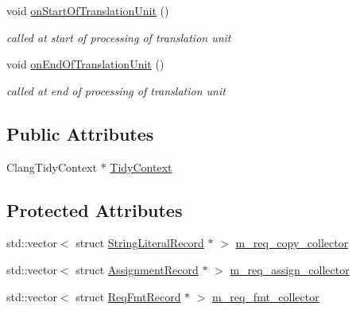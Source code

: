 \begin{DoxyCompactItemize}
void \hyperlink{classclang_1_1tidy_1_1pagesjaunes_1_1_exec_s_q_l_l_o_b_close_to_function_call_a229d757dae72929f6282a71940161a6b}{on\+Start\+Of\+Translation\+Unit} ()
\begin{DoxyCompactList}\small\item\em called at start of processing of translation unit \end{DoxyCompactList}\item 
void \hyperlink{classclang_1_1tidy_1_1pagesjaunes_1_1_exec_s_q_l_l_o_b_close_to_function_call_ac67efcc243c9d7907d70c1f01cb08a63}{on\+End\+Of\+Translation\+Unit} ()
\begin{DoxyCompactList}\small\item\em called at end of processing of translation unit \end{DoxyCompactList}\end{DoxyCompactItemize}
\subsection*{Public Attributes}
\begin{DoxyCompactItemize}
\item 
Clang\+Tidy\+Context $\ast$ \hyperlink{classclang_1_1tidy_1_1pagesjaunes_1_1_exec_s_q_l_l_o_b_close_to_function_call_a83576fb1bf338c03a55dbd8915525f0c}{Tidy\+Context}
\end{DoxyCompactItemize}
\subsection*{Protected Attributes}
\begin{DoxyCompactItemize}
\item 
std\+::vector$<$ struct \hyperlink{structclang_1_1tidy_1_1pagesjaunes_1_1_exec_s_q_l_l_o_b_close_to_function_call_1_1_string_literal_record}{String\+Literal\+Record} $\ast$ $>$ \hyperlink{classclang_1_1tidy_1_1pagesjaunes_1_1_exec_s_q_l_l_o_b_close_to_function_call_a688918c0b5711128c559047ba31ba43f}{m\+\_\+req\+\_\+copy\+\_\+collector}
\item 
std\+::vector$<$ struct \hyperlink{structclang_1_1tidy_1_1pagesjaunes_1_1_exec_s_q_l_l_o_b_close_to_function_call_1_1_assignment_record}{Assignment\+Record} $\ast$ $>$ \hyperlink{classclang_1_1tidy_1_1pagesjaunes_1_1_exec_s_q_l_l_o_b_close_to_function_call_af88110235eba78cbd239b1f05a759c1e}{m\+\_\+req\+\_\+assign\+\_\+collector}
\item 
std\+::vector$<$ struct \hyperlink{structclang_1_1tidy_1_1pagesjaunes_1_1_exec_s_q_l_l_o_b_close_to_function_call_1_1_req_fmt_record}{Req\+Fmt\+Record} $\ast$ $>$ \hyperlink{classclang_1_1tidy_1_1pagesjaunes_1_1_exec_s_q_l_l_o_b_close_to_function_call_ad9166d7d8113e08e11b4361b3722e0b5}{m\+\_\+req\+\_\+fmt\+\_\+collector}
\end{DoxyCompactItemize}


